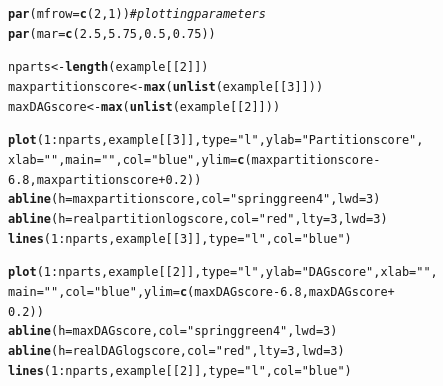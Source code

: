 \documentclass[a4paper]{article}\usepackage[]{graphicx}\usepackage[]{color}
\makeatletter
\newcommand{\hlnum}[1]{\textcolor[rgb]{0.686,0.059,0.569}{#1}}%
\newcommand{\hlstr}[1]{\textcolor[rgb]{0.192,0.494,0.8}{#1}}%
\newcommand{\hlcom}[1]{\textcolor[rgb]{0.678,0.584,0.686}{\textit{#1}}}%
\newcommand{\hlopt}[1]{\textcolor[rgb]{0,0,0}{#1}}%
\newcommand{\hlstd}[1]{\textcolor[rgb]{0.345,0.345,0.345}{#1}}%
\newcommand{\hlkwb}[1]{\textcolor[rgb]{0.69,0.353,0.396}{#1}}%
\newcommand{\hlkwc}[1]{\textcolor[rgb]{0.333,0.667,0.333}{#1}}%
\newcommand{\hlkwd}[1]{\textcolor[rgb]{0.737,0.353,0.396}{\textbf{#1}}}%
\newenvironment{kframe}{%
 \def\at@end@of@kframe{}%
 \ifinner\ifhmode%
  \def\at@end@of@kframe{\end{minipage}}%
  \begin{minipage}{\columnwidth}%
 \fi\fi%
 \def\FrameCommand##1{\hskip\@totalleftmargin \hskip-\fboxsep
 \colorbox{shadecolor}{##1}\hskip-\fboxsep
     \hskip-\linewidth \hskip-\@totalleftmargin \hskip\columnwidth}%
 \MakeFramed {\advance\hsize-\width
   \@totalleftmargin\z@ \linewidth\hsize
   \@setminipage}}%
 {\par\unskip\endMakeFramed%
 \at@end@of@kframe}
\newenvironment{knitrout}{}{} %
\makeatother
\begin{document}
\begin{knitrout}
\color{fgcolor}\begin{kframe}
\begin{alltt}
\hlkwd{par}\hlstd{(}\hlkwc{mfrow} \hlstd{=} \hlkwd{c}\hlstd{(}\hlnum{2}\hlstd{,} \hlnum{1}\hlstd{))}  \hlcom{# plotting parameters}
\hlkwd{par}\hlstd{(}\hlkwc{mar} \hlstd{=} \hlkwd{c}\hlstd{(}\hlnum{2.5}\hlstd{,} \hlnum{5.75}\hlstd{,} \hlnum{0.5}\hlstd{,} \hlnum{0.75}\hlstd{))}

\hlstd{nparts} \hlkwb{<-} \hlkwd{length}\hlstd{(example[[}\hlnum{2}\hlstd{]])}
\hlstd{maxpartitionscore} \hlkwb{<-} \hlkwd{max}\hlstd{(}\hlkwd{unlist}\hlstd{(example[[}\hlnum{3}\hlstd{]]))}
\hlstd{maxDAGscore} \hlkwb{<-} \hlkwd{max}\hlstd{(}\hlkwd{unlist}\hlstd{(example[[}\hlnum{2}\hlstd{]]))}

\hlkwd{plot}\hlstd{(}\hlnum{1}\hlopt{:}\hlstd{nparts, example[[}\hlnum{3}\hlstd{]],} \hlkwc{type} \hlstd{=} \hlstr{"l"}\hlstd{,} \hlkwc{ylab} \hlstd{=} \hlstr{"Partition score"}\hlstd{,}
    \hlkwc{xlab} \hlstd{=} \hlstr{""}\hlstd{,} \hlkwc{main} \hlstd{=} \hlstr{""}\hlstd{,} \hlkwc{col} \hlstd{=} \hlstr{"blue"}\hlstd{,} \hlkwc{ylim} \hlstd{=} \hlkwd{c}\hlstd{(maxpartitionscore} \hlopt{-}
        \hlnum{6.8}\hlstd{, maxpartitionscore} \hlopt{+} \hlnum{0.2}\hlstd{))}
\hlkwd{abline}\hlstd{(}\hlkwc{h} \hlstd{= maxpartitionscore,} \hlkwc{col} \hlstd{=} \hlstr{"springgreen4"}\hlstd{,} \hlkwc{lwd} \hlstd{=} \hlnum{3}\hlstd{)}
\hlkwd{abline}\hlstd{(}\hlkwc{h} \hlstd{= realpartitionlogscore,} \hlkwc{col} \hlstd{=} \hlstr{"red"}\hlstd{,} \hlkwc{lty} \hlstd{=} \hlnum{3}\hlstd{,} \hlkwc{lwd} \hlstd{=} \hlnum{3}\hlstd{)}
\hlkwd{lines}\hlstd{(}\hlnum{1}\hlopt{:}\hlstd{nparts, example[[}\hlnum{3}\hlstd{]],} \hlkwc{type} \hlstd{=} \hlstr{"l"}\hlstd{,} \hlkwc{col} \hlstd{=} \hlstr{"blue"}\hlstd{)}

\hlkwd{plot}\hlstd{(}\hlnum{1}\hlopt{:}\hlstd{nparts, example[[}\hlnum{2}\hlstd{]],} \hlkwc{type} \hlstd{=} \hlstr{"l"}\hlstd{,} \hlkwc{ylab} \hlstd{=} \hlstr{"DAG score"}\hlstd{,} \hlkwc{xlab} \hlstd{=} \hlstr{""}\hlstd{,}
    \hlkwc{main} \hlstd{=} \hlstr{""}\hlstd{,} \hlkwc{col} \hlstd{=} \hlstr{"blue"}\hlstd{,} \hlkwc{ylim} \hlstd{=} \hlkwd{c}\hlstd{(maxDAGscore} \hlopt{-} \hlnum{6.8}\hlstd{, maxDAGscore} \hlopt{+}
        \hlnum{0.2}\hlstd{))}
\hlkwd{abline}\hlstd{(}\hlkwc{h} \hlstd{= maxDAGscore,} \hlkwc{col} \hlstd{=} \hlstr{"springgreen4"}\hlstd{,} \hlkwc{lwd} \hlstd{=} \hlnum{3}\hlstd{)}
\hlkwd{abline}\hlstd{(}\hlkwc{h} \hlstd{= realDAGlogscore,} \hlkwc{col} \hlstd{=} \hlstr{"red"}\hlstd{,} \hlkwc{lty} \hlstd{=} \hlnum{3}\hlstd{,} \hlkwc{lwd} \hlstd{=} \hlnum{3}\hlstd{)}
\hlkwd{lines}\hlstd{(}\hlnum{1}\hlopt{:}\hlstd{nparts, example[[}\hlnum{2}\hlstd{]],} \hlkwc{type} \hlstd{=} \hlstr{"l"}\hlstd{,} \hlkwc{col} \hlstd{=} \hlstr{"blue"}\hlstd{)}
\end{alltt}
\end{kframe}


\end{knitrout}
\end{document}
